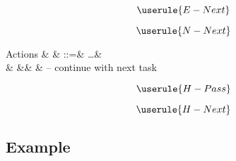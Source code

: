 \begin{equation*}
  \userule{E-Next}
\end{equation*}

\begin{equation*}
  \userule{N-Next}
\end{equation*}

\begin{grammar}
  Actions
    & \alpha & ::=& \ldots & \\
    &        &\mid& \Continue  & – continue with next task \\
\end{grammar}

\begin{equation*}
  \userule{H-Pass}
\end{equation*}

\begin{equation*}
  \userule{H-Next}
\end{equation*}

\subsection{Example}
